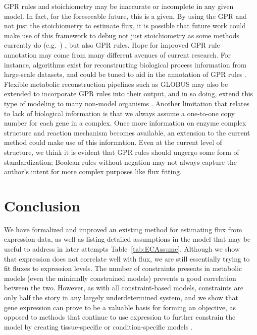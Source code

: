 GPR rules and stoichiometry may be inaccurate or
incomplete in any given model. In fact, for the foreseeable future,
this is a given. By using the GPR and not just the stoichiometry to
estimate flux, it is possible that future work could make use of this
framework to debug not just stoichiometry as some methods currently do
(e.g.\ \citealt{Reed14112006}) , but also GPR rules.  Hope for
improved GPR rule annotation may come from many different avenues of
current research. For instance, algorithms exist for reconstructing
biological process information from large-scale datasets, and could be
tuned to aid in the annotation of GPR rules \citep{Mitra2013}. 
Flexible metabolic reconstruction pipelines such as
GLOBUS may also be extended to incorporate GPR rules into their output, and
in so doing, extend this type of modeling to many non-model organisms
\citep{Plata2012}. Another limitation that relates to lack of
biological information is that we always assume a one-to-one copy
number for each gene in a complex. Once more information on enzyme
complex structure and reaction mechanism becomes available, an
extension to the current method could make use of this information.
Even at the current level of structure, we think it is evident
that GPR rules should ungergo some form of standardization;
Boolean rules without negation may not always capture the author's
intent for more complex purposes like flux fitting.



%
%


\section{Conclusion}

We have formalized and improved an existing method for estimating flux
from expression data, as well as listing detailed assumptions in the
model that may be useful to address in later attempts
\suppOrApp Table~\ref{tab:ECAssume}. Although we show that expression does not
correlate well with flux, we are still essentially trying to fit
fluxes to expression levels.  The number of constraints presents in
metabolic models (even the minimally constrained models) prevents 
a good correlation between the two. However, as
with all constraint-based models, constraints are only half the story in any largely
underdetermined system, and we show that gene expression can prove to
be a valuable basis for forming an objective, as opposed to methods
that continue to use expression to further constrain the model by
creating tissue-specific or condition-specific models
\citep{Shlomi2008,Becker2008}.

